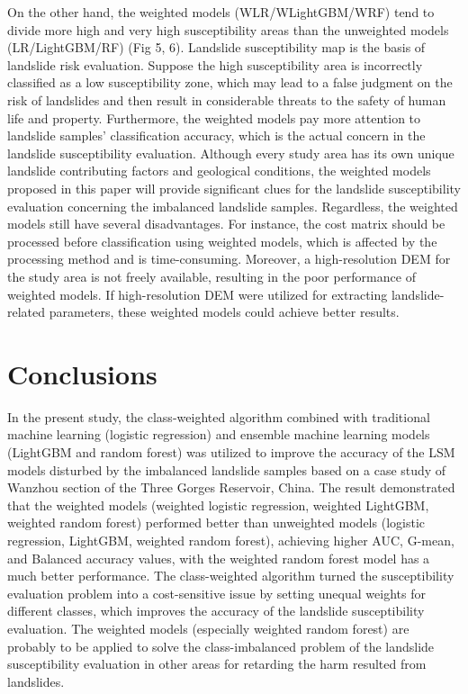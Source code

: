 \documentclass[a4paper,fleqn]{cas-sc}
\begin{document}
On the other hand, the weighted models (WLR/WLightGBM/WRF) tend to divide more high and very high susceptibility areas than the unweighted models (LR/LightGBM/RF) (Fig 5, 6). Landslide susceptibility map is the basis of landslide risk evaluation. Suppose the high susceptibility area is incorrectly classified as a low susceptibility zone, which may lead to a false judgment on the risk of landslides and then result in considerable threats to the safety of human life and property. Furthermore, the weighted models pay more attention to landslide samples' classification accuracy, which is the actual concern in the landslide susceptibility evaluation. Although every study area has its own unique landslide contributing factors and geological conditions, the weighted models proposed in this paper will provide significant clues for the landslide susceptibility evaluation concerning the imbalanced landslide samples. Regardless, the weighted models still have several disadvantages. 
For instance, the cost matrix should be processed before classiﬁcation using weighted models, which is affected by the processing method and is time-consuming. Moreover, a high-resolution DEM for the study area is not freely available, resulting in the poor performance of weighted models. If high-resolution DEM were utilized for extracting landslide-related parameters, these weighted models could achieve better results. 

\section{Conclusions}

In the present study, the class-weighted algorithm combined with traditional machine learning (logistic regression) and ensemble machine learning models (LightGBM and random forest) was utilized to improve the accuracy of the LSM models disturbed by the imbalanced landslide samples based on a case study of Wanzhou section of the Three Gorges Reservoir, China. The result demonstrated that the weighted models (weighted logistic regression, weighted LightGBM, weighted random forest) performed better than unweighted models (logistic regression, LightGBM, weighted random forest), achieving higher AUC, G-mean, and Balanced accuracy values, with the weighted random forest model has a much better performance. The class-weighted algorithm turned the susceptibility evaluation problem into a cost-sensitive issue by setting unequal weights for different classes, which improves the accuracy of the landslide susceptibility evaluation. The weighted models (especially weighted random forest) are probably to be applied to solve the class-imbalanced problem of the landslide susceptibility evaluation in other areas for retarding the harm resulted from landslides. 
\end{document}
